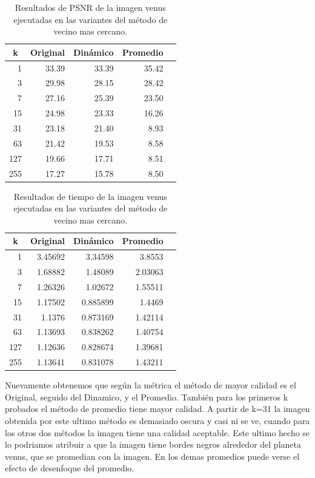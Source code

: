 \documentclass[a4paper]{article}
\newcounter{col}
\begin{document}
\begin{table}[H]
\centering
\begin{tabular}{|r|r|r|r|r|}
\hline
\multicolumn{1}{|c|}{k} & \multicolumn{1}{c|}{Original} & \multicolumn{1}{c|}{Dinámico} & \multicolumn{1}{c|}{Promedio} \\ \hline
1 & 33.39 & 33.39& 35.42 \\ \hline
3 & 29.98 &  28.15 & 28.42 \\ \hline
7 & 27.16 &  25.39 &  23.50 \\ \hline
15 &24.98&  23.33 &  16.26 \\ \hline
31 & 23.18 & 21.40&  8.93 \\ \hline
63 & 21.42 &   19.53 & 8.58 \\ \hline
127 & 19.66 &  17.71 &  8.51 \\ \hline
255 &17.27&  15.78 & 8.50 \\ \hline
\end{tabular}
\caption{Resultados de PSNR de la imagen venus ejecutadas en las variantes del m\'etodo de vecino mas cercano.}
\label{}
\end{table}

\begin{table}[H]
\centering
\begin{tabular}{|r|r|r|r|r|}
\hline
\multicolumn{1}{|c|}{k} & \multicolumn{1}{c|}{Original} & \multicolumn{1}{c|}{Dinámico} & \multicolumn{1}{c|}{Promedio} \\ \hline
1 & 3.45692 & 3.34598& 3.8553 \\ \hline
3 & 1.68882 &  1.48089 & 2.03063 \\ \hline
7 & 1.26326 & 1.02672 &  1.55511 \\ \hline
15 &1.17502&  0.885899&  1.4469 \\ \hline
31 & 1.1376 & 0.873169&  1.42114 \\ \hline
63 & 1.13693 &   0.838262& 1.40754 \\ \hline
127 & 1.12636 &  0.828674 &  1.39681 \\ \hline
255 &1.13641&  0.831078 & 1.43211 \\ \hline
\end{tabular}
\caption{Resultados de tiempo de la imagen venus ejecutadas en las variantes del m\'etodo de vecino mas cercano.}
\label{}
\end{table}



Nuevamente obtenemos que según la métrica el método de mayor calidad es el Original, seguido del Dinamico, y el Promedio. También para los primeros k probados el método de promedio tiene mayor calidad. A partir de k=31 la imagen obtenida por este ultimo método es demasiado oscura y casi ni se ve, cuando para los otros dos métodos la imagen tiene una calidad aceptable. Este ultimo hecho se lo podriamos atribuir a que la imagen tiene bordes negros alrededor del planeta venus, que se promedian con la imagen. En los demas promedios puede verse el efecto de desenfoque del promedio.
\end{document}
